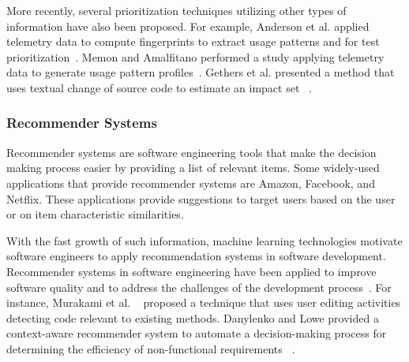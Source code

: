 More recently, several prioritization techniques 
utilizing other types of information have also been proposed. 
For example, Anderson et al. applied telemetry data to compute fingerprints 
to extract usage patterns and for test prioritization~\cite{jeff16}.
Memon and Amalfitano performed a study applying telemetry 
data to generate usage pattern profiles~\cite{memongui}.  
Gethers et al. presented a method  that uses textual change of source code
to estimate an impact set ~\cite{kagdichange}. 

\subsubsection*{Recommender Systems}  
Recommender systems are software engineering tools that make 
the decision making process easier by providing a list of relevant items.
Some widely-used applications that provide recommender systems
are Amazon, Facebook, and Netflix. These applications provide suggestions
to target users based on the user or on item characteristic similarities.  

With the fast growth of such information, machine learning technologies  
motivate software engineers to apply recommendation systems in software 
development. Recommender systems in software engineering have been applied  
to improve software quality and to address the challenges of the development process~\cite{rssebook}.  
For instance, Murakami et al. ~\cite{murakami} proposed a technique that 
uses user editing activities  detecting code relevant to existing methods. 
Danylenko and Lowe provided a context-aware recommender system 
to automate a decision-making process for determining the efficiency of 
non-functional requirements ~\cite{contextawar}.

